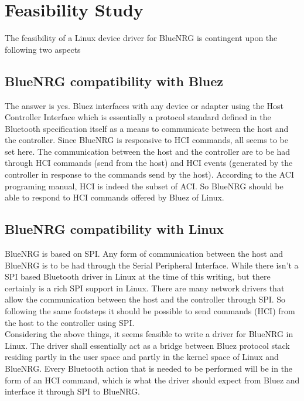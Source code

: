 \chapter{Feasibility Study}
The feasibility of a Linux device driver for BlueNRG is contingent upon the following two aspects
\section{BlueNRG compatibility with Bluez}
The answer is yes. Bluez interfaces with any device or adapter using the Host Controller Interface which is essentially a protocol standard defined in the Bluetooth specification itself as a means to communicate between the host and the controller. Since BlueNRG is responsive to HCI commands, all seems to be set here. The communication between the host and the controller are to be had through HCI commands (send from the host) and HCI events (generated by the controller in response to the commands send by the host). According to the ACI programing manual, HCI is indeed the subset of ACI. So BlueNRG should be able to respond to HCI commands offered by Bluez of Linux.
\section{BlueNRG compatibility with Linux}
BlueNRG is based on SPI. Any form of communication between the host and BlueNRG is to be had through the Serial Peripheral Interface. While there isn’t a SPI based Bluetooth driver in Linux at the time of this writing, but there certainly is a rich SPI support in Linux. There are many network drivers that allow the communication between the host and the controller through SPI. So following the same footsteps it should be possible to send commands (HCI) from the host to the controller using SPI.\\
Considering the above things, it seems feasible to write a driver for BlueNRG in Linux. The driver shall essentially act as a bridge between Bluez protocol stack residing partly in the user space and partly in the kernel space of Linux and BlueNRG. Every Bluetooth action that is needed to be performed will be in the form of an HCI command, which is what the driver should expect from Bluez and interface it through SPI to BlueNRG.
